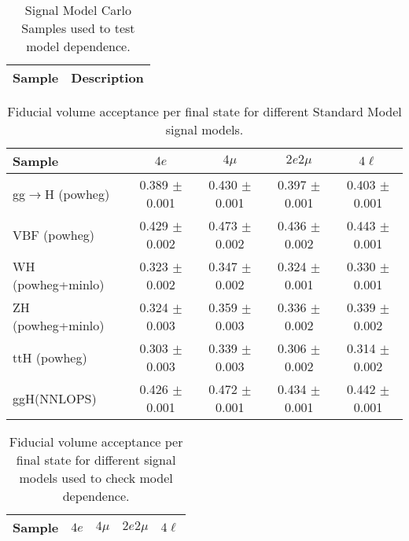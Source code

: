  
 
\begin{table}[!h!tb]
\begin{center}
\small
\caption{
Signal Model Carlo Samples used to test model dependence.
\label{tab:samplesExo}
}
\begin{tabular}{|l|c|} \hline 
Sample & Description \\ \hline 

\hline
\end{tabular}
\normalsize
\end{center}
\end{table}
 
 
 
\begin{table}[!h!tb]
\begin{center}
\small
\caption{
Fiducial volume acceptance per final state for different Standard Model signal models.
\label{tab:acceptanceSM}
}
\begin{tabular}{|l|c|c|c|c|} \hline 
Sample & $4e$ & $4\mu$ & $2e2\mu$ & $4\ell$ \\ \hline 
gg$\rightarrow$H ({\sc powheg})  & 0.389 $\pm$ 0.001 & 0.430 $\pm$ 0.001 & 0.397 $\pm$ 0.001 & 0.403 $\pm$ 0.001 \\ 
VBF ({\sc powheg})  & 0.429 $\pm$ 0.002 & 0.473 $\pm$ 0.002 & 0.436 $\pm$ 0.002 & 0.443 $\pm$ 0.001 \\ 
WH ({\sc powheg+minlo}) & 0.323 $\pm$ 0.002 & 0.347 $\pm$ 0.002 & 0.324 $\pm$ 0.001 & 0.330 $\pm$ 0.001 \\ 
ZH ({\sc powheg+minlo})  & 0.324 $\pm$ 0.003 & 0.359 $\pm$ 0.003 & 0.336 $\pm$ 0.002 & 0.339 $\pm$ 0.002 \\ 
ttH ({\sc powheg}) & 0.303 $\pm$ 0.003 & 0.339 $\pm$ 0.003 & 0.306 $\pm$ 0.002 & 0.314 $\pm$ 0.002 \\ 
ggH(NNLOPS) & 0.426 $\pm$ 0.001 & 0.472 $\pm$ 0.001 & 0.434 $\pm$ 0.001 & 0.442 $\pm$ 0.001 \\ 

\hline
\end{tabular}
\normalsize
\end{center}
\end{table}
 
 
 
\begin{table}[!h!tb]
\begin{center}
\small
\caption{
Fiducial volume acceptance per final state for different signal models used to check model dependence.
\label{tab:acceptanceExo}
}
\begin{tabular}{|l|c|c|c|c|} \hline 
Sample & $4e$ & $4\mu$ & $2e2\mu$ & $4\ell$ \\ \hline 

\hline
\end{tabular}
\normalsize
\end{center}
\end{table}
 
